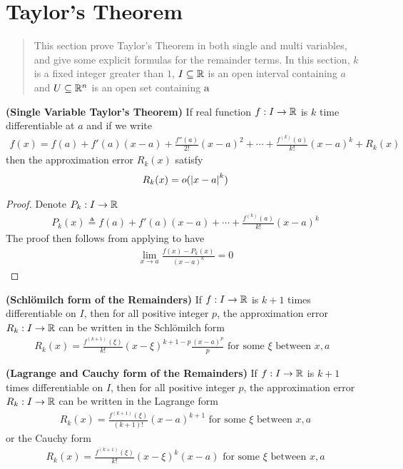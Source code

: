 \documentclass{report}
\begin{document}
\section{Taylor's Theorem}
\label{Taylor's Theorem}
\begin{abstract}
This section prove Taylor's Theorem in both single and multi variables, and give some explicit formulas for the remainder terms. In this section, $k$ is a fixed integer greater than $1$, $I\subseteq \mathbb{R}$ is an open interval containing $a$ and $U\subseteq \mathbb{R}^n$ is an open set containing $\textbf{a}$  
\end{abstract}
\begin{theorem}
\textbf{(Single Variable Taylor's Theorem)} If real function $f:I\rightarrow \mathbb{R}$ is $k$ time differentiable at  $a$ and if we write 
\begin{align*}
f(x)= f(a)+ f'(a)(x-a)+\frac{f''(a)}{2!}(x-a)^2+\cdots + \frac{f^{(k)}(a)}{k!}(x-a)^{k}+ R_k(x)
\end{align*}
then the approximation error $R_k(x)$ satisfy 
\begin{align*}
R_k(x)=o(\left|x-a\right|^k)
\end{align*}
\end{theorem}
\begin{proof}
Denote $P_k:I\rightarrow \mathbb{R}$ 
\begin{align*}
P_k(x)\triangleq f(a)+f'(a)(x-a)+\cdots + \frac{f^{(k)}(a)}{k!}(x-a)^k
\end{align*}
The proof then follows from applying  to have 
\begin{align*}
\lim_{x\to a} \frac{f(x)-P_k(x)}{(x-a)^k}=0 
\end{align*}
\end{proof}
\begin{theorem}
\textbf{(Schlömilch form of the Remainders)} If $f:I\rightarrow \mathbb{R}$ is $k+1$ times  differentiable on $I$, then for all positive integer $p$, the approximation error  $R_k:I\rightarrow \mathbb{R}$ can be written in the Schlömilch form  
\begin{align*}
R_k(x)= \frac{f^{(k+1)}(\xi)}{k!}(x-\xi)^{k+1-p} \frac{(x-a)^p}{p}\text{ for some }\xi\text{ between $x,a$ }
\end{align*}
\end{theorem}
\begin{corollary}
\textbf{(Lagrange and Cauchy form of the Remainders)} If $f:I\rightarrow \mathbb{R}$ is  $k+1$ times differentiable on $I$, then for all positive integer $p$, the approximation error  $R_k:I\rightarrow \mathbb{R}$ can be written in the Lagrange form  
\begin{align*}
R_k(x)= \frac{f^{(k+1)}(\xi)}{(k+1)!}(x-a)^{k+1}\text{ for some }\xi\text{ between }x,a
\end{align*}
or the Cauchy form 
\begin{align*}
R_k(x)= \frac{f^{(k+1)}(\xi)}{k!}(x-\xi)^{k} (x-a)\text{ for some }\xi\text{ between }x,a
\end{align*}
\end{corollary}
\end{document}
